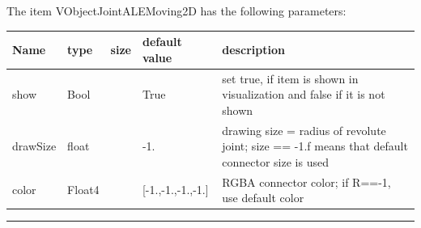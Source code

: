 The item VObjectJointALEMoving2D has the following parameters:\vspace{-1cm}\\ 
\begin{center}
  \footnotesize
  \begin{longtable}{| p{4.5cm} | p{2.5cm} | p{0.5cm} | p{2.5cm} | p{6cm} |}
    \hline
    \bf Name & \bf type & \bf size & \bf default value & \bf description \\ \hline
    show &     Bool &      &     True &     set true, if item is shown in visualization and false if it is not shown\\ \hline
    drawSize &     float &      &     -1. &     drawing size = radius of revolute joint; size == -1.f means that default connector size is used\\ \hline
    color &     Float4 &      &     [-1.,-1.,-1.,-1.] &     RGBA connector color; if R==-1, use default color\\ \hline
	  \end{longtable}
	\end{center}
\par\noindent\rule{\textwidth}{0.4pt}
\label{description_ObjectJointALEMoving2D}

